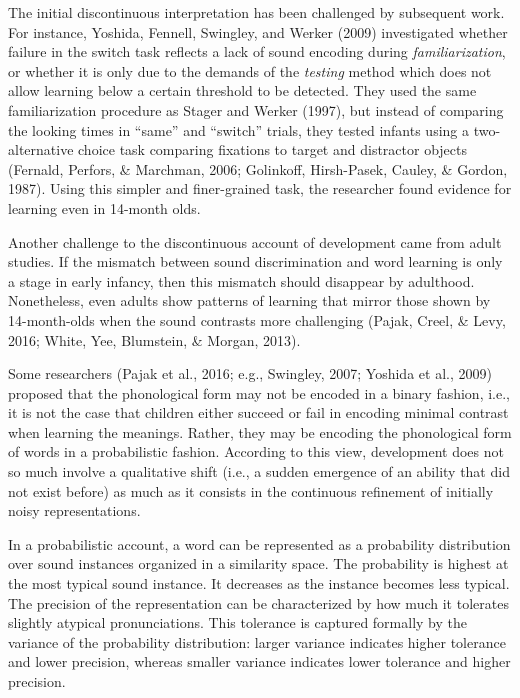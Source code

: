 \documentclass[english,,man,floatsintext]{apa6}
\theoremstyle{definition}
\theoremstyle{definition}
\theoremstyle{definition}
\theoremstyle{remark}
\begin{document}
The initial discontinuous interpretation has been challenged by
subsequent work. For instance, Yoshida, Fennell, Swingley, and Werker
(2009) investigated whether failure in the switch task reflects a lack
of sound encoding during \emph{familiarization}, or whether it is only
due to the demands of the \emph{testing} method which does not allow
learning below a certain threshold to be detected. They used the same
familiarization procedure as Stager and Werker (1997), but instead of
comparing the looking times in \enquote{same} and \enquote{switch}
trials, they tested infants using a two-alternative choice task
comparing fixations to target and distractor objects (Fernald, Perfors,
\& Marchman, 2006; Golinkoff, Hirsh-Pasek, Cauley, \& Gordon, 1987).
Using this simpler and finer-grained task, the researcher found evidence
for learning even in 14-month olds.

Another challenge to the discontinuous account of development came from
adult studies. If the mismatch between sound discrimination and word
learning is only a stage in early infancy, then this mismatch should
disappear by adulthood. Nonetheless, even adults show patterns of
learning that mirror those shown by 14-month-olds when the sound
contrasts more challenging (Pajak, Creel, \& Levy, 2016; White, Yee,
Blumstein, \& Morgan, 2013).

Some researchers (Pajak et al., 2016; e.g., Swingley, 2007; Yoshida et
al., 2009) proposed that the phonological form may not be encoded in a
binary fashion, i.e., it is not the case that children either succeed or
fail in encoding minimal contrast when learning the meanings. Rather,
they may be encoding the phonological form of words in a probabilistic
fashion. According to this view, development does not so much involve a
qualitative shift (i.e., a sudden emergence of an ability that did not
exist before) as much as it consists in the continuous refinement of
initially noisy representations.

In a probabilistic account, a word can be represented as a probability
distribution over sound instances organized in a similarity space. The
probability is highest at the most typical sound instance. It decreases
as the instance becomes less typical. The precision of the
representation can be characterized by how much it tolerates slightly
atypical pronunciations. This tolerance is captured formally by the
variance of the probability distribution: larger variance indicates
higher tolerance and lower precision, whereas smaller variance indicates
lower tolerance and higher precision.
\end{document}
